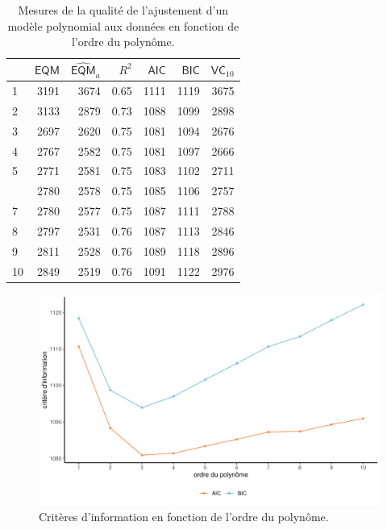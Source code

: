 \documentclass[
  11pt,
  letterpaper,
]{scrbook}
\theoremstyle{definition}
\theoremstyle{remark}
\begin{document}
\hypertarget{tbl-polynome-ajustement}{}
\begin{table}
\caption{\label{tbl-polynome-ajustement}Mesures de la qualité de l'ajustement d'un modèle polynomial aux données
en fonction de l'ordre du polynôme. }\tabularnewline

\centering
\begin{tabular}{lrrrrrr}
\toprule
  & \(\mathsf{EQM}\) & \(\widehat{\mathsf{EQM}}_a\) & \(R^2\) & \(\mathsf{AIC}\) & \(\mathsf{BIC}\) & \(\mathsf{VC}_{10}\)\\
\midrule
1 & 3191 & 3674 & 0.65 & 1111 & 1119 & 3675\\
2 & 3133 & 2879 & 0.73 & 1088 & 1099 & 2898\\
3 & 2697 & 2620 & 0.75 & 1081 & 1094 & 2676\\
4 & 2767 & 2582 & 0.75 & 1081 & 1097 & 2666\\
5 & 2771 & 2581 & 0.75 & 1083 & 1102 & 2711\\
\addlinespace
6 & 2780 & 2578 & 0.75 & 1085 & 1106 & 2757\\
7 & 2780 & 2577 & 0.75 & 1087 & 1111 & 2788\\
8 & 2797 & 2531 & 0.76 & 1087 & 1113 & 2846\\
9 & 2811 & 2528 & 0.76 & 1089 & 1118 & 2896\\
10 & 2849 & 2519 & 0.76 & 1091 & 1122 & 2976\\
\bottomrule
\end{tabular}
\end{table}

\begin{figure}[ht!]

{\centering \includegraphics[width=1\textwidth,height=\textheight]{selectionmodeles_files/figure-pdf/fig-polynome-ajustement-1.pdf}

}

\caption{\label{fig-polynome-ajustement}Critères d'information en
fonction de l'ordre du polynôme.}

\end{figure}
\end{document}
